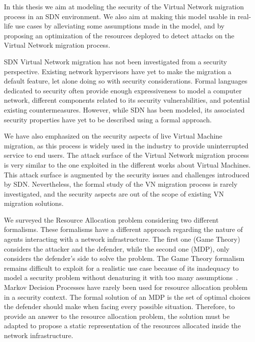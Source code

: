 In this thesis we aim at modeling the security of the Virtual Network migration process in an SDN environment.
We also aim at making this model usable in real-life use cases by alleviating some assumptions made in the model, and by proposing an optimization of the resources deployed to detect attacks on the Virtual Network migration process.

SDN Virtual Network migration has not been investigated from a security perspective.
Existing network hypervisors have yet to make the migration a default feature, let alone doing so with security considerations.
Formal languages dedicated to security often provide enough expressiveness to model a computer network, different components related to its security vulnerabilities, and potential existing countermeasures.
However, while SDN has been modeled, its associated security properties have yet to be described using a formal approach.

We have also emphasized on the security aspects of live Virtual Machine migration, as this process is widely used in the industry to provide uninterrupted service to end users. 
The attack surface of the Virtual Network migration process is very similar to the one exploited in the different works about Virtual Machines. This attack surface is augmented by the security issues and challenges introduced by SDN. Nevertheless, the formal study of the VN migration process is rarely investigated, and the security aspects are out of the scope of existing VN migration solutions.

We surveyed the Resource Allocation problem considering two different formalisms. These formalisms have a different approach regarding the nature of agents interacting with a network infrastructure. The first one (\ie Game Theory) considers the attacker and the defender, while the second one (\ie MDP), only considers the defender's side to solve the problem.
The Game Theory formalism remains difficult to exploit for a realistic use case because of its inadequacy to model a security problem without denaturing it with too many assumptions~\cite{Kiennert2018}.
Markov Decision Processes have rarely been used for resource allocation problem in a security context. The formal solution of an MDP is the set of optimal choices the defender should make when facing every possible situation. Therefore, to provide an answer to the resource allocation problem, the solution must be adapted to propose a static representation of the resources allocated inside the network infrastructure.

